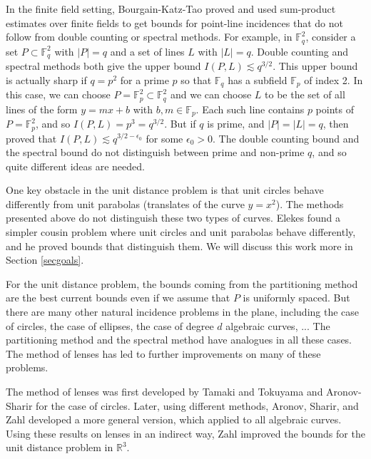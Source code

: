 \documentclass{amsart}
\newcommand{\FF}{\mathbb{F}}
\newcommand{\RR}{\mathbb{R}}
\begin{document}
In the finite field setting,  Bourgain-Katz-Tao \cite{BKT} proved and used sum-product estimates over finite fields to get bounds for point-line incidences that do not follow from double counting or spectral methods.   For example,  in $\FF_q^2$,  consider a set $P \subset \FF_q^2$ with $|P| = q$ and a set of lines $L$ with $|L| = q$.     Double counting and spectral methods both give the upper bound $I(P, L) \lesssim q^{3/2}$.   This upper bound is actually sharp if $q = p^2$ for a prime $p$ so that $\FF_q$ has a subfield $\FF_p$ of index 2.   In this case,  we can choose $P = \FF_p^2 \subset \FF_q^2$ and we can choose $L$ to be the set of all lines of the form $y = mx + b$ with $b, m \in \FF_p$.   Each such line contains $p$ points of $P = \FF_p^2$,  and so $I(P, L) = p^3 = q^{3/2}$.    But if $q$ is prime,  and $|P| = |L| = q$,  then \cite{BKT} proved that $I(P, L) \lesssim q^{3/2 - \epsilon_0}$ for some $\epsilon_0 > 0$.   The double counting bound and the spectral bound do not distinguish between prime and non-prime $q$,  and so quite different ideas are needed.  %

One key obstacle in the unit distance problem is that unit circles behave differently from unit parabolas (translates of the curve $y = x^2$).   The methods presented above do not distinguish these two types of curves.   Elekes found a simpler cousin problem where unit circles and unit parabolas behave differently,  and he proved bounds that distinguish them.   We will discuss this work more in Section \ref{secgoals}.

For the unit distance problem,  the bounds coming from the partitioning method are the best current bounds  even if we assume that $P$ is uniformly spaced.   But there are many other natural incidence problems in the plane,  including the case of circles,  the case of ellipses,  the case of degree $d$ algebraic curves,  ...   The partitioning method and the spectral method have analogues in all these cases.   The method of lenses has led to further improvements on many of these problems.

The method of lenses was first developed by Tamaki and Tokuyama \cite{TT} and Aronov-Sharir \cite{AS} for the case of circles.   Later,  using different methods,  Aronov, Sharir, and Zahl \cite{SZ} developed a more general version,  which applied to all algebraic curves.    Using these results on lenses in an indirect way,  Zahl \cite{Z} improved the bounds for the unit distance problem in $\RR^3$.   
\end{document}
